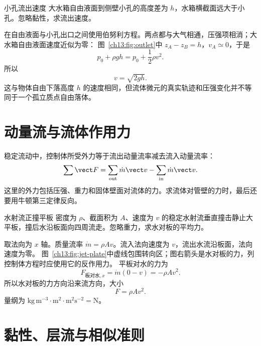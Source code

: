 \begin{origexamplebox}{小孔流出速度}\label{ch13:ex:outlet}
大水箱自由液面到侧壁小孔的高度差为 $h$，水箱横截面远大于小孔。忽略黏性，求流出速度。
\end{origexamplebox}
\begin{xesolution}
在自由液面与小孔出口之间使用伯努利方程。两点都与大气相通，压强项相消；大水箱自由液面速度近似为零：
\FluidOutletDiagram
图~\ref{ch13:fig:outlet}中 $z_A-z_B=h$，$v_A\simeq0$，于是
\[
 p_0+\rho gh=p_0+\frac12\rho v^2.
\]
所以
\[
 \boxed{v=\sqrt{2gh}}.
\]
这与物体自由下落高度 $h$ 的速度相同，但流体微元的真实轨迹和压强变化并不等同于一个孤立质点自由落体。
\end{xesolution}

\section{动量流与流体作用力}\label{ch13:sec:momentum}

稳定流动中，控制体所受外力等于流出动量流率减去流入动量流率：
\begin{equation}
 \sum\vect F=\sum_{\rm out}\dot m\vect v-
 \sum_{\rm in}\dot m\vect v.
\end{equation}
这里的外力包括压强、重力和固体壁面对流体的力。求流体对管壁的力时，最后还要用牛顿第三定律反向。

\begin{origexamplebox}{水射流正撞平板}\label{ch13:ex:jet-plate}
密度为 $\rho$、截面积为 $A$、速度为 $v$ 的稳定水射流垂直撞击静止大平板，撞后水沿板面向四周流走。忽略重力，求水对板的平均力。
\end{origexamplebox}
\begin{xesolution}
取法向为 $x$ 轴。质量流率 $\dot m=\rho Av$。流入法向速度为 $v$，流出水流沿板面，法向速度为零。
\FluidPlateDiagram
图~\ref{ch13:fig:jet-plate}中虚线包围转向区；图右箭头是水对板的力，列控制体方程时应使用它的反作用力。
平板对水的力为
\[
 F_{\text{板对水},x}=\dot m(0-v)=-\rho Av^2.
\]
所以水对板的力方向沿来流方向，大小
\[
 \boxed{F=\rho Av^2}.
\]
量纲为 $\mathrm{kg\,m^{-3}}\cdot\mathrm{m^2}\cdot\mathrm{m^2s^{-2}}=\mathrm N$。
\end{xesolution}


\section{黏性、层流与相似准则}\label{ch13:sec:viscosity}

